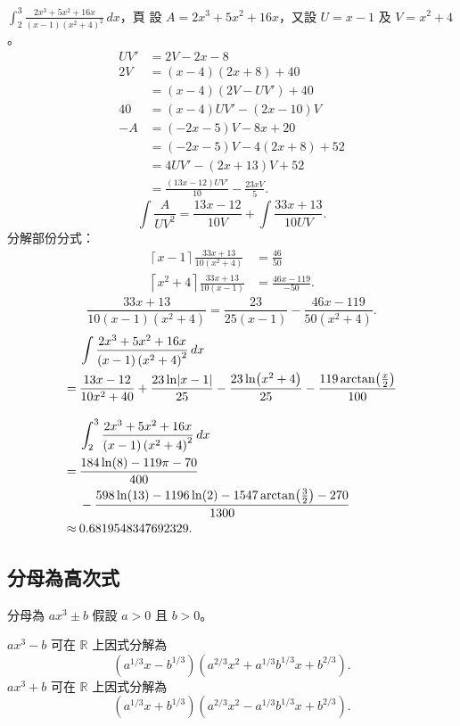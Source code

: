 \documentclass{beamer}
\newcommand{\Left} {\mathopen{}\mathclose\bgroup\left}
\newcommand{\Right}{\aftergroup\egroup\right}
\newcommand{\R}{\mathbb R}
\theoremstyle{remark}
\begin{document}
\begin{CJK}{UTF8}{bsmi}
\begin{frame}[allowframebreaks]{$\displaystyle \int_2^3 \frac{2x^3 + 5x^2 + 16x}
    {(x-1) \left( x^2 + 4 \right)^2}\,dx$，頁}
  設 $A = 2x^3 + 5x^2 + 16x$，又設 $U = x-1$ 及 $V = x^2 + 4$。
  \begin{align*}
    UV' &= 2V - 2x - 8\\
    2V  &= (x - 4) \left( 2x + 8 \right) + 40\\
	&= (x - 4) \left( 2V - UV' \right) + 40\\
    40  &= \left( x - 4 \right) UV' - \left( 2x - 10 \right) V\\
    -A  &= \left( -2x - 5 \right) V - 8x + 20\\
	&= \left( -2x - 5 \right) V - 4 \left( 2x + 8 \right) + 52\\
	&= 4UV' - \left( 2x + 13 \right) V + 52\\
	&= \frac{\left( 13x - 12 \right) UV'}{10} - \frac{23xV}{5}.
  \end{align*}
  \[\int \frac{A}{UV^2} = \frac{13x - 12}{10V} + \int \frac{33x + 13}{10UV}.\]
  分解部份分式：
  \begin{align*}
    \left\lceil x - 1 \right\rceil   \frac{33x + 13}{10 \left( x^2 + 4 \right)} &= \frac{46}{50}\\
    \left\lceil x^2 + 4 \right\rceil \frac{33x + 13}{10 \left( x   - 1 \right)} &= \frac{46x - 119}{-50}.
  \end{align*}
  \[\frac{33x + 13}{10 \left( x   - 1 \right) \left( x^2 + 4 \right)} = \frac{23}{25 \left( x - 1 \right)}
    -\frac{46x - 119}{50 \left( x^2 + 4 \right)}.\]
  \begin{align*}
       & \int \frac{2x^3 + 5x^2 + 16x}{(x-1) \left( x^2 + 4 \right)^2}\,dx\\
    =\:& \frac{13x - 12}{10x^2 + 40} + \frac{23 \ln \Left| x - 1 \Right|}{25} - \frac{23 \ln \Left( x^2 + 4 \Right)}{25}
	 -\frac{119 \arctan \Left( \frac x 2 \Right)}{100}\\[1em]
       & \int_2^3 \frac{2x^3 + 5x^2 + 16x}{(x-1) \left( x^2 + 4 \right)^2}\,dx\\
    =\:& \frac{184\ln(8) - 119\pi - 70}{400}\\
    \phantom=\:& -\frac{598\ln(13) - 1196\ln(2) - 1547 \arctan \Left( \frac32 \Right) - 270}{1300}\\
    \approx\:& 0.6819548347692329.
  \end{align*}
\end{frame}

\subsection{分母為高次式}
\begin{frame}{分母為 $ax^3 \pm b$}
  假設 $a > 0$ 且 $b > 0$。
  \begin{theorem}
    $ax^3 - b$ 可在 $\R$ 上因式分解為
    \[\left( a^{1/3}x - b^{1/3} \right) \left( a^{2/3}x^2 + a^{1/3} b^{1/3} x + b^{2/3} \right).\]
    $ax^3 + b$ 可在 $\R$ 上因式分解為
    \[\left( a^{1/3}x + b^{1/3} \right) \left( a^{2/3}x^2 - a^{1/3} b^{1/3} x + b^{2/3} \right).\]
  \end{theorem}
\end{frame}


\end{CJK}
\end{document}

